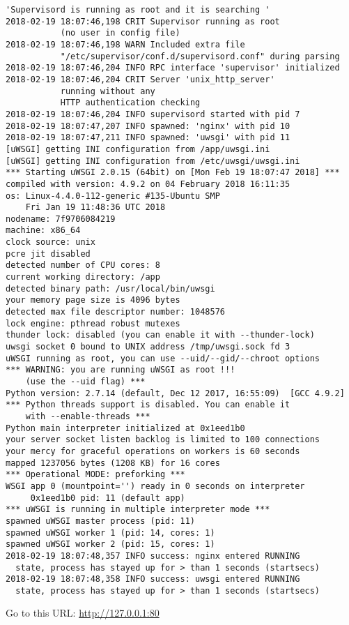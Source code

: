 \begin{lstlisting}[basicstyle=\footnotesize]
'Supervisord is running as root and it is searching '
2018-02-19 18:07:46,198 CRIT Supervisor running as root 
           (no user in config file)
2018-02-19 18:07:46,198 WARN Included extra file
           "/etc/supervisor/conf.d/supervisord.conf" during parsing
2018-02-19 18:07:46,204 INFO RPC interface 'supervisor' initialized
2018-02-19 18:07:46,204 CRIT Server 'unix_http_server' 
           running without any
           HTTP authentication checking
2018-02-19 18:07:46,204 INFO supervisord started with pid 7
2018-02-19 18:07:47,207 INFO spawned: 'nginx' with pid 10
2018-02-19 18:07:47,211 INFO spawned: 'uwsgi' with pid 11
[uWSGI] getting INI configuration from /app/uwsgi.ini
[uWSGI] getting INI configuration from /etc/uwsgi/uwsgi.ini
*** Starting uWSGI 2.0.15 (64bit) on [Mon Feb 19 18:07:47 2018] ***
compiled with version: 4.9.2 on 04 February 2018 16:11:35
os: Linux-4.4.0-112-generic #135-Ubuntu SMP 
    Fri Jan 19 11:48:36 UTC 2018
nodename: 7f9706084219
machine: x86_64
clock source: unix
pcre jit disabled
detected number of CPU cores: 8
current working directory: /app
detected binary path: /usr/local/bin/uwsgi
your memory page size is 4096 bytes
detected max file descriptor number: 1048576
lock engine: pthread robust mutexes
thunder lock: disabled (you can enable it with --thunder-lock)
uwsgi socket 0 bound to UNIX address /tmp/uwsgi.sock fd 3
uWSGI running as root, you can use --uid/--gid/--chroot options
*** WARNING: you are running uWSGI as root !!! 
    (use the --uid flag) *** 
Python version: 2.7.14 (default, Dec 12 2017, 16:55:09)  [GCC 4.9.2]
*** Python threads support is disabled. You can enable it 
    with --enable-threads ***
Python main interpreter initialized at 0x1eed1b0
your server socket listen backlog is limited to 100 connections
your mercy for graceful operations on workers is 60 seconds
mapped 1237056 bytes (1208 KB) for 16 cores
*** Operational MODE: preforking ***
WSGI app 0 (mountpoint='') ready in 0 seconds on interpreter 
     0x1eed1b0 pid: 11 (default app)
*** uWSGI is running in multiple interpreter mode ***
spawned uWSGI master process (pid: 11)
spawned uWSGI worker 1 (pid: 14, cores: 1)
spawned uWSGI worker 2 (pid: 15, cores: 1)
2018-02-19 18:07:48,357 INFO success: nginx entered RUNNING 
  state, process has stayed up for > than 1 seconds (startsecs)
2018-02-19 18:07:48,358 INFO success: uwsgi entered RUNNING 
  state, process has stayed up for > than 1 seconds (startsecs)

\end{lstlisting}


Go to this URL: \url{http://127.0.0.1:80}

